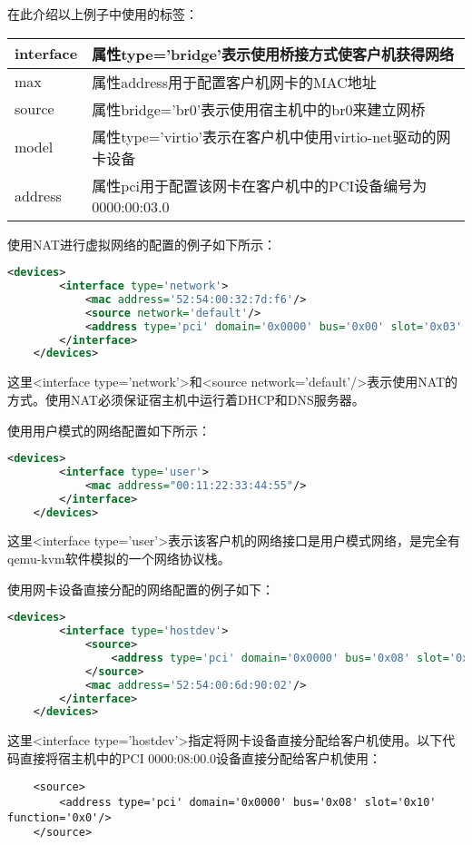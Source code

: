 \documentclass[a4paper,left=2.5cm,right=2.5cm,11pt]{article}
\newcommand{\interval}{\vspace{0.5em}}
\begin{document}
	在此介绍以上例子中使用的标签：
	\interval
	\begin{longtable}{p{2.5cm}p{10cm}}
	\hline
	interface & 属性type='bridge'表示使用桥接方式使客户机获得网络 \\
	\hline
	max & 属性address用于配置客户机网卡的MAC地址 \\
	\hline
	source & 属性bridge='br0'表示使用宿主机中的br0来建立网桥 \\
	\hline
	model & 属性type='virtio'表示在客户机中使用virtio-net驱动的网卡设备 \\
	\hline
	address & 属性pci用于配置该网卡在客户机中的PCI设备编号为0000:00:03.0 \\
	\hline
	\end{longtable}

	使用NAT进行虚拟网络的配置的例子如下所示：
	\begin{lstlisting}[language = XML]
	<devices>
		<interface type='network'>
			<mac address='52:54:00:32:7d:f6'/>
			<source network='default'/>
			<address type='pci' domain='0x0000' bus='0x00' slot='0x03' function='0x0'/>
		</interface>
	</devices>
	\end{lstlisting}

	这里<interface type='network'>和<source network='default'/>表示使用NAT的方式。使用NAT必须保证宿主机中运行着DHCP和DNS服务器。\par

	使用用户模式的网络配置如下所示：
	\begin{lstlisting}[language = XML]
	<devices>
		<interface type='user'>
			<mac address="00:11:22:33:44:55"/>
		</interface>
	</devices>
	\end{lstlisting}

	这里<interface type='user'>表示该客户机的网络接口是用户模式网络，是完全有qemu-kvm软件模拟的一个网络协议栈。\par

	使用网卡设备直接分配的网络配置的例子如下：
	\begin{lstlisting}[language = XML]
	<devices>
		<interface type='hostdev'>
			<source>
				<address type='pci' domain='0x0000' bus='0x08' slot='0x10' function='0x0'/>
			</source>
			<mac address='52:54:00:6d:90:02'/>
		</interface>
	</devices>
	\end{lstlisting}

	这里<interface type='hostdev'>指定将网卡设备直接分配给客户机使用。以下代码直接将宿主机中的PCI 0000:08:00.0设备直接分配给客户机使用：
	\begin{lstlisting}
	<source>
		<address type='pci' domain='0x0000' bus='0x08' slot='0x10' function='0x0'/>
	</source>
	\end{lstlisting}
\end{document}
